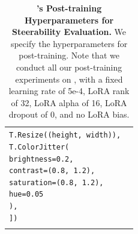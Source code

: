 \begin{table}[!htbp]
\begin{tabular}{l*{1}{>{\centering\arraybackslash}p{8.4cm}}}
{{\texttt{\hspace*{1em}T.Resize((height, width)),}\\
\texttt{\hspace*{1em}T.ColorJitter(}\\
\texttt{\hspace*{2em}brightness=0.2,}\\
\texttt{\hspace*{2em}contrast=(0.8, 1.2),}\\
\texttt{\hspace*{2em}saturation=(0.8, 1.2),}\\
\texttt{\hspace*{2em}hue=0.05}\\
\texttt{\hspace*{1em}),}\\
\texttt{])}
}} \\
\addlinespace[4pt]  
\bottomrule
\end{tabular}
\caption{\textbf{\molmoact's Post-training Hyperparameters for Steerability Evaluation.} We specify the hyperparameters for \molmoact post-training. Note that we conduct all our post-training experiments on \molmoactd, with a fixed learning rate of 5e-4, LoRA rank of 32, LoRA alpha of 16, LoRA dropout of 0, and no LoRA bias.}
\label{tab:hyperparams_real_steer}
\end{table}